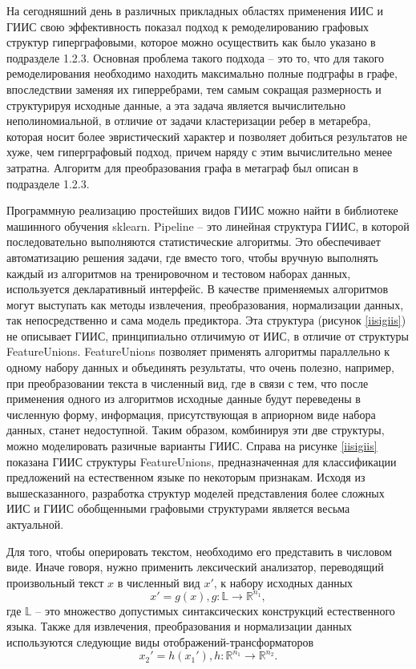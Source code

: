 На сегодняшний день в различных прикладных областях применения ИИС и ГИИС свою эффективность показал подход к ремоделированию графовых структур гиперграфовыми, которое можно осуществить как было указано в подразделе 1.2.3. Основная проблема такого подхода -- это то, что для такого ремоделирования необходимо находить максимально полные подграфы в графе, впоследствии заменяя их гиперребрами, тем самым сокращая размерность и структурируя исходные данные, а эта задача является вычислительно неполиномиальной, в отличие от задачи кластеризации ребер в метаребра, которая носит более эвристический характер и позволяет добиться результатов не хуже, чем гиперграфовый подход, причем наряду с этим вычислительно менее затратна. Алгоритм для преобразования графа в метаграф был описан в подразделе 1.2.3.

Программную реализацию простейших видов ГИИС можно найти в библиотеке машинного обучения sklearn. Pipeline
-- это линейная структура ГИИС, в которой последовательно выполняются статистические алгоритмы. Это обеспечивает автоматизацию решения задачи, где вместо того, чтобы вручную выполнять каждый из алгоритмов на тренировочном и тестовом наборах данных, используется декларативный интерфейс. В качестве применяемых алгоритмов могут выступать как методы извлечения, преобразования, нормализации данных, так непосредственно и сама модель предиктора. Эта структура (рисунок \ref{iisigiis}) не описывает ГИИС, принципиально отличимую от ИИС, в отличие от структуры FeatureUnions. FeatureUnions позволяет применять алгоритмы параллельно к одному набору данных и объединять результаты, что очень полезно, например, при преобразовании текста в численный вид, где в связи с тем, что после применения одного из алгоритмов исходные данные будут переведены в численную форму, информация, присутствующая в априорном виде набора данных, станет недоступной. Таким образом, комбинируя эти две структуры, можно моделировать разичные варианты ГИИС. Справа на рисунке \ref{iisigiis} показана ГИИС структуры FeatureUnions, предназначенная для классификации предложений на естественном языке по некоторым признакам. Исходя из вышесказанного, разработка структур моделей представления более сложных ИИС и ГИИС обобщенными графовыми структурами является весьма актуальной. 

Для того, чтобы оперировать текстом, необходимо его представить в числовом виде. Иначе говоря, нужно применить лексический анализатор, переводящий произвольный текст $x$ в численный вид $x'$, к набору исходных данных 
$$x' = g(x), g:\mathbb{L} \to \mathbb{R}^{n_1},$$
 где $\mathbb{L}$ -- это множество допустимых синтаксических конструкций естественного языка. Также для извлечения, преобразования и нормализации данных используются следующие виды отображений-трансформаторов 
 $$x_2' = h(x_1'), h: \mathbb{R}^{n_1} \to \mathbb{R}^{n_2}.$$

